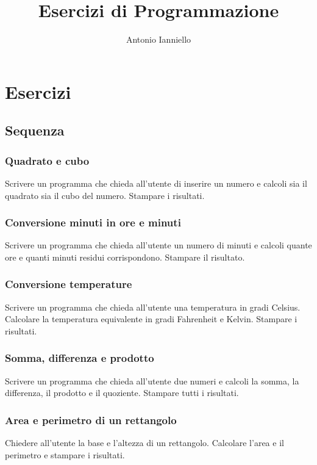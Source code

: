 \documentclass[a4paper,12pt]{article}
\title{Esercizi di Programmazione}
\author{Antonio Ianniello}
\date{}   %
\begin{document}
	
	\maketitle
	\newpage
	\tableofcontents
	
	\newpage
	
	\section{Esercizi}
	
	\subsection{Sequenza}
	
	\subsubsection{Quadrato e cubo}
	Scrivere un programma che chieda all'utente di inserire un numero e calcoli sia il quadrato sia il cubo del numero. Stampare i risultati.
	
	\subsubsection{Conversione minuti in ore e minuti}
	Scrivere un programma che chieda all'utente un numero di minuti e calcoli quante ore e quanti minuti residui corrispondono. Stampare il risultato.
	
	\subsubsection{Conversione temperature}
	Scrivere un programma che chieda all'utente una temperatura in gradi Celsius. Calcolare la temperatura equivalente in gradi Fahrenheit e Kelvin. Stampare i risultati.
	
	\subsubsection{Somma, differenza e prodotto}
	Scrivere un programma che chieda all'utente due numeri e calcoli la somma, la differenza, il prodotto e il quoziente. Stampare tutti i risultati.
	
	
	\subsubsection{Area e perimetro di un rettangolo}
	Chiedere all'utente la base e l'altezza di un rettangolo. Calcolare l'area e il perimetro e stampare i risultati.
	
\end{document}
